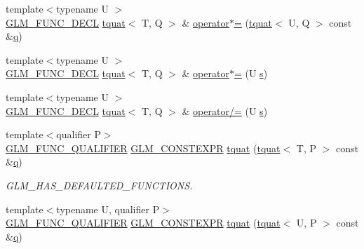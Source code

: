 \begin{DoxyCompactItemize}
\item 
{\footnotesize template$<$typename U $>$ }\\\hyperlink{setup_8hpp_ab2d052de21a70539923e9bcbf6e83a51}{G\+L\+M\+\_\+\+F\+U\+N\+C\+\_\+\+D\+E\+CL} \hyperlink{structglm_1_1tquat}{tquat}$<$ T, Q $>$ \& \hyperlink{structglm_1_1tquat_af1d51deda165d1be3e644353f9c26d55}{operator$\ast$=} (\hyperlink{structglm_1_1tquat}{tquat}$<$ U, Q $>$ const \&\hyperlink{_s_d_l__opengl_8h_a8fc1e7b9baaae687804c7eed46ca09c6}{q})
\item 
{\footnotesize template$<$typename U $>$ }\\\hyperlink{setup_8hpp_ab2d052de21a70539923e9bcbf6e83a51}{G\+L\+M\+\_\+\+F\+U\+N\+C\+\_\+\+D\+E\+CL} \hyperlink{structglm_1_1tquat}{tquat}$<$ T, Q $>$ \& \hyperlink{structglm_1_1tquat_aceb92eef28cbd87273cf81bf0bd71fde}{operator$\ast$=} (U \hyperlink{_s_d_l__opengl_8h_a4af680a6c683f88ed67b76f207f2e6e4}{s})
\item 
{\footnotesize template$<$typename U $>$ }\\\hyperlink{setup_8hpp_ab2d052de21a70539923e9bcbf6e83a51}{G\+L\+M\+\_\+\+F\+U\+N\+C\+\_\+\+D\+E\+CL} \hyperlink{structglm_1_1tquat}{tquat}$<$ T, Q $>$ \& \hyperlink{structglm_1_1tquat_aed8e8a44af5bcae23e60b4ddc170e762}{operator/=} (U \hyperlink{_s_d_l__opengl_8h_a4af680a6c683f88ed67b76f207f2e6e4}{s})
\item 
{\footnotesize template$<$qualifier P$>$ }\\\hyperlink{setup_8hpp_a33fdea6f91c5f834105f7415e2a64407}{G\+L\+M\+\_\+\+F\+U\+N\+C\+\_\+\+Q\+U\+A\+L\+I\+F\+I\+ER} \hyperlink{setup_8hpp_a08b807947b47031d3a511f03f89645ad}{G\+L\+M\+\_\+\+C\+O\+N\+S\+T\+E\+X\+PR} \hyperlink{structglm_1_1tquat_ab59e0622b75684ae91e699d2f4b41cef}{tquat} (\hyperlink{structglm_1_1tquat}{tquat}$<$ T, P $>$ const \&\hyperlink{_s_d_l__opengl_8h_a8fc1e7b9baaae687804c7eed46ca09c6}{q})
\begin{DoxyCompactList}\small\item\em G\+L\+M\+\_\+\+H\+A\+S\+\_\+\+D\+E\+F\+A\+U\+L\+T\+E\+D\+\_\+\+F\+U\+N\+C\+T\+I\+O\+NS. \end{DoxyCompactList}\item 
{\footnotesize template$<$typename U, qualifier P$>$ }\\\hyperlink{setup_8hpp_a33fdea6f91c5f834105f7415e2a64407}{G\+L\+M\+\_\+\+F\+U\+N\+C\+\_\+\+Q\+U\+A\+L\+I\+F\+I\+ER} \hyperlink{setup_8hpp_a08b807947b47031d3a511f03f89645ad}{G\+L\+M\+\_\+\+C\+O\+N\+S\+T\+E\+X\+PR} \hyperlink{structglm_1_1tquat_a7646314c6d0f3d3f4df1e940e3181baa}{tquat} (\hyperlink{structglm_1_1tquat}{tquat}$<$ U, P $>$ const \&\hyperlink{_s_d_l__opengl_8h_a8fc1e7b9baaae687804c7eed46ca09c6}{q})

\end{DoxyCompactItemize}

